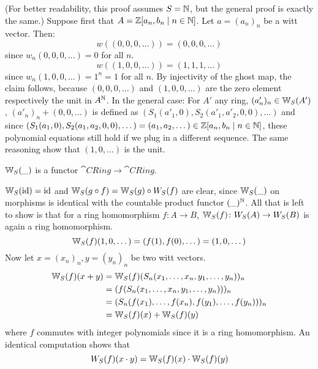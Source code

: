 \begin{beweis}
    (For better readability, this proof assumes $S = \mathbb{N}$, but the general proof is exactly the same.)
    Suppose first that $A = \mathbb{Z}[a_n, b_n \mid n \in \mathbb{N}]$. Let $a = (a_n)_n$ be a witt vector.
    Then:
    \[
       w((0,0,0,\dots)) = (0,0,0,\dots) 
    \]
    since $w_n(0,0,0,\dots) = 0$ for all $n$.
    \[
        w((1,0,0,\dots)) = (1,1,1,\dots)
    \]
    since $w_n(1,0,0,\dots) = 1^n = 1$ for all $n$.
    By injectivity of the ghost map, the claim follows, because $(0,0,0,\dots)$
    and $(1,0,0,\dots)$ are the zero element respectively the unit in $A^{\mathbb{N}}$.
    In the general case: For $A'$ any ring, $(a'_n)_n \in \mathbb{W}_S(A')$,
    $(a'_n)_n + (0,0,\dots)$ is defined as $(S_1(a'_1,0),S_2(a'_1,a'_2,0,0),\dots)$
    and since $(S_1(a_1,0),S_2(a_1,a_2,0,0),\dots) = (a_1,a_2,\dots) \in \mathbb{Z}[a_n,b_n \mid n \in \mathbb{N}]$,
    these polynomial equations still hold if we plug in a different sequence. The
    same reasoning show that $(1,0,\dots)$ is the unit.
\end{beweis}
\begin{proposition} \label{prop: W is a functor}
    $\mathbb{W}_S(\_)$ is a functor $\cat{CRing} \to \cat{CRing}$.
\end{proposition}
\begin{beweis}
$\mathbb{W}_S(\operatorname{id}) = \operatorname{id}$ and $\mathbb{W}_S(g \circ f) = \mathbb{W}_S(g) \circ W_S(f)$
are clear, since $\mathbb{W}_S(\_)$ on morphisms is identical with the countable product
functor $(\_)^{\mathbb{N}}$. All that is left to show is that for a ring homomorphism
$f\colon A \to B$, $\mathbb{W}_S(f) \colon W_S(A) \to W_S(B)$ is again 
a ring homomorphism.
\[
    \mathbb{W}_S(f)(1,0,\dots) = (f(1),f(0),\dots) = (1,0,\dots)
\]
Now let $x = (x_n)_n, y = (y_n)_n$ be two witt vectors.
\begin{align*}
    \mathbb{W}_S(f)(x+y) &= \mathbb{W}_S(f)(S_n(x_1,\dots,x_n,y_1,\dots,y_n))_n \\
    &= (f(S_n(x_1,\dots,x_n,y_1,\dots,y_n)))_n \\
    &= (S_n(f(x_1),\dots,f(x_n),f(y_1),\dots,f(y_n)))_n \\
    &= \mathbb{W}_S(f)(x) + \mathbb{W}_S(f)(y)
\end{align*}
where $f$ commutes with integer polynomials since it is a ring homomorphism.
An identical computation shows that
\[
    W_S(f)(x \cdot y) = \mathbb{W}_S(f)(x) \cdot \mathbb{W}_S(f)(y)
\]
\end{beweis}
